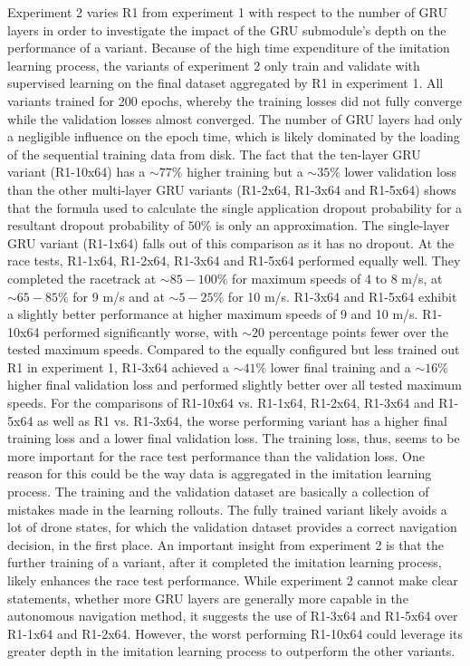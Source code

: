 Experiment 2 varies R1 from experiment 1 
with respect to the number of GRU layers in order to investigate the impact of the 
GRU submodule's depth on the performance of a variant. 
Because of the high time expenditure of the imitation learning process, 
the variants of experiment 2 only train and validate with supervised learning on the 
final dataset aggregated by R1 in experiment 1. 
All variants trained for 200 epochs, whereby the training losses did not fully converge 
while the validation losses almost converged. The number of GRU layers had only 
a negligible influence on the epoch time, which is likely dominated by the loading 
of the sequential training data from disk.
The fact that the ten-layer GRU variant (R1-10x64)
has a $\sim 77\%$ higher training
but a $\sim 35\%$ lower validation loss 
than the other multi-layer GRU variants (R1-2x64, R1-3x64 and R1-5x64)
shows that the formula used to calculate the single application dropout probability
for a resultant dropout probability of $50\%$ is only an approximation.
The single-layer GRU variant (R1-1x64) falls out of this comparison as it has no dropout.
At the race tests, R1-1x64, R1-2x64, R1-3x64 and R1-5x64 performed equally well.
They completed the racetrack at $\sim 85 - 100\%$ for maximum speeds of 4 to 8 m/s,
at $\sim 65 - 85\%$ for 9 m/s 
and at $\sim 5 - 25\%$ for 10 m/s.
R1-3x64 and R1-5x64 exhibit a slightly better performance at higher maximum speeds of 9 and 10 m/s.
R1-10x64 performed significantly worse, 
with $\sim 20$ percentage points fewer over the tested maximum speeds.
Compared to the equally configured but less trained out R1 in experiment 1,
R1-3x64 achieved a $\sim 41\%$ lower final training
and a $\sim 16\%$ higher final validation loss
and performed slightly better over all tested maximum speeds.
For the comparisons of R1-10x64 vs. R1-1x64, R1-2x64, R1-3x64 and R1-5x64
as well as R1 vs. R1-3x64,
the worse performing variant has a higher final training loss and a lower final validation loss.
The training loss, thus, seems to be more important for the race test performance than the validation loss.
One reason for this could be the way data is aggregated in the imitation learning process.
The training and the validation dataset are basically a collection of mistakes made in the learning rollouts.
The fully trained variant likely avoids a lot of drone states, 
for which the validation dataset provides a correct navigation decision,
in the first place.
An important insight from experiment 2 is that 
the further training of a variant, after it completed the imitation learning process,
likely enhances the race test performance.
While experiment 2 cannot make clear statements,
whether more GRU layers are generally more capable in the autonomous navigation method,
it suggests the use of R1-3x64 and R1-5x64 over R1-1x64 and R1-2x64.
However, the worst performing R1-10x64
could leverage its greater depth 
in the imitation learning process
to outperform the other variants.



